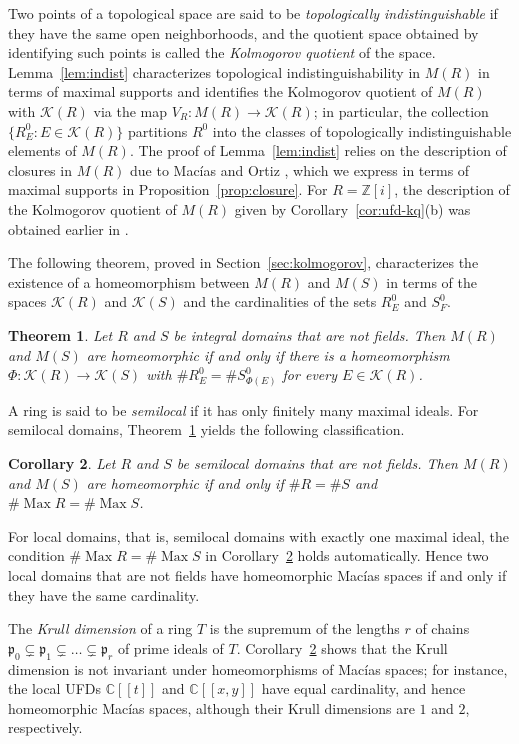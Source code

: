 \documentclass[12pt,reqno,a4paper]{amsart}
\newcommand{\Z}{\mathbb{Z}}
\newcommand{\C}{\mathbb{C}}
\newcommand{\K}{\mathcal{K}}
\newcommand{\pow}[1]{[\![#1]\!]}
\DeclareMathOperator{\Max}{Max}
\theoremstyle{plain}
\newtheorem{theorem}{Theorem}[section]
\newtheorem{corollary}[theorem]{Corollary}
\theoremstyle{definition}
\begin{document}
Two points of a topological space are said to be \emph{topologically indistinguishable} if they have the same open neighborhoods, and the quotient space obtained by identifying such points is called the \emph{Kolmogorov quotient} of the space. Lemma~\ref{lem:indist} characterizes topological indistinguishability in $M(R)$ in terms of maximal supports and identifies the Kolmogorov quotient of $M(R)$ with $\K(R)$ via the map $V_R\colon M(R)\to\K(R)$; in particular, the collection $\{R^0_E:E\in\K(R)\}$ partitions $R^0$ into the classes of topologically indistinguishable elements of $M(R)$. The proof of Lemma~\ref{lem:indist} relies on the description of closures in $M(R)$ due to Mac\'ias and Ortiz \cite[Proposition~3.8]{MaciasOrtiz}, which we express in terms of maximal supports in Proposition~\ref{prop:closure}. For $R=\Z[i]$, the description of the Kolmogorov quotient of $M(R)$ given by Corollary~\ref{cor:ufd-kq}(b) was obtained earlier in \cite{Mandal}.

The following theorem, proved in Section~\ref{sec:kolmogorov}, characterizes the existence of a homeomorphism between $M(R)$ and $M(S)$ in terms of the spaces $\K(R)$ and $\K(S)$ and the cardinalities of the sets $R^0_E$ and $S^0_F$.
\begin{theorem}\label{thm:A}
Let $R$ and $S$ be integral domains that are not fields. Then $M(R)$ and $M(S)$ are homeomorphic if and only if there is a homeomorphism $\Phi\colon\K(R)\to\K(S)$ with $\#R^0_E=\#S^0_{\Phi(E)}$ for every $E\in\K(R)$.
\end{theorem}

A ring is said to be \emph{semilocal} if it has only finitely many maximal ideals. For semilocal domains, Theorem~\ref{thm:A} yields the following classification.
\begin{corollary}\label{cor:semilocal}
Let $R$ and $S$ be semilocal domains that are not fields. Then $M(R)$ and $M(S)$ are homeomorphic if and only if $\#R=\#S$ and $\#{\Max R}=\#{\Max S}$.
\end{corollary}

For local domains, that is, semilocal domains with exactly one maximal ideal, the condition $\#{\Max R}=\#{\Max S}$ in Corollary~\ref{cor:semilocal} holds automatically. Hence two local domains that are not fields have homeomorphic Mac\'ias spaces if and only if they have the same cardinality.

The \emph{Krull dimension} of a ring $T$ is the supremum of the lengths $r$ of chains $\mathfrak p_0\subsetneq\mathfrak p_1\subsetneq\dots\subsetneq\mathfrak p_r$ of prime ideals of $T$. Corollary~\ref{cor:semilocal} shows that the Krull dimension is not invariant under homeomorphisms of Mac\'ias spaces; for instance, the local UFDs $\C\pow{t}$ and $\C\pow{x,y}$ have equal cardinality, and hence homeomorphic Mac\'ias spaces, although their Krull dimensions are $1$ and $2$, respectively.
\end{document}
